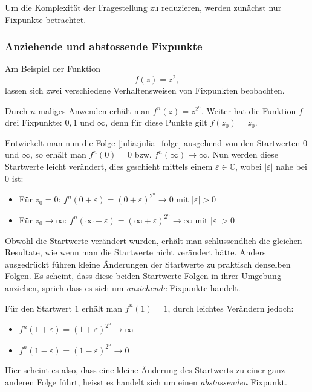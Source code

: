 Um die Komplexität der Fragestellung zu reduzieren, werden zunächst nur Fixpunkte betrachtet.

\subsubsection{Anziehende und abstossende Fixpunkte}
Am Beispiel der Funktion 
\begin{equation*}
    f(z) = z^2,
\end{equation*}
lassen sich zwei verschiedene Verhaltensweisen von Fixpunkten beobachten.

Durch $n$-maliges Anwenden erhält man $f^n(z) = z^{2^n}$.
Weiter hat die Funktion $f$ drei Fixpunkte: $0, 1$ und $\infty$, denn für diese Punkte gilt $f(z_0) = z_0$.

Entwickelt man nun die Folge \eqref{julia:julia_folge} ausgehend von den Startwerten $0$ und $\infty$, so erhält man $f^n(0) = 0$ bzw. $f^n(\infty) \to \infty$.
Nun werden diese Startwerte leicht verändert, dies geschieht mittels einem $\varepsilon \in \mathbb{C}$, wobei $|\varepsilon|$ nahe bei $0$ ist:
\begin{itemize}
    \item Für $z_0 = 0$: $f^n(0 + \varepsilon) = (0 + \varepsilon)^{2^n} \to 0$ mit $|\varepsilon| > 0$
    \item Für $z_0 \to \infty$: $f^n(\infty + \varepsilon) = (\infty + \varepsilon)^{2^n} \to \infty$ mit $|\varepsilon| > 0$
\end{itemize}
Obwohl die Startwerte verändert wurden, erhält man schlussendlich die gleichen Resultate, wie wenn man die Startwerte nicht verändert hätte.
Anders ausgedrückt führen kleine Änderungen der Startwerte zu praktisch denselben Folgen.
Es scheint, dass diese beiden Startwerte Folgen in ihrer Umgebung anziehen, sprich dass es sich um \emph{anziehende} Fixpunkte handelt.
%
%

Für den Startwert $1$ erhält man $f^n(1) = 1$, durch leichtes Verändern jedoch:
\begin{itemize}
    \item $f^n(1 + \varepsilon) = (1 + \varepsilon)^{2^n} \to \infty$
    \item $f^n(1 - \varepsilon) = (1 - \varepsilon)^{2^n} \to 0$
\end{itemize}
Hier scheint es also, dass eine kleine Änderung des Startwerts zu einer ganz anderen Folge führt, heisst es handelt sich um einen \emph{abstossenden} Fixpunkt.
%

